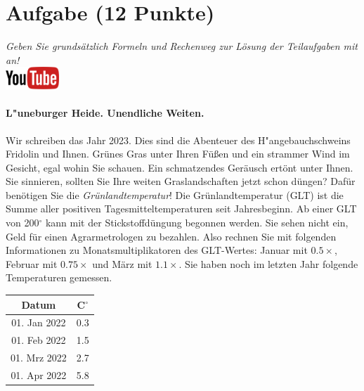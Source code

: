 \documentclass[a4paper, 9pt]{scrartcl}\usepackage[]{graphicx}\usepackage[]{xcolor}
\begin{document}
\clearpage

\section{Aufgabe \hfill (12 Punkte)}

\textit{Geben Sie grunds{\"a}tzlich Formeln und Rechenweg zur L{\"o}sung der
  Teilaufgaben mit an!} \\[1Ex]

\hfill\href{https://youtu.be/fiWGgCX-cE4}{\includegraphics[width =
  2cm]{img/youtube}} %
\hspace{2Ex}



\paragraph{L{"u}neburger Heide. Unendliche Weiten.}



Wir schreiben das Jahr 2023. Dies sind die Abenteuer
des H{"a}ngebauchschweins Fridolin und Ihnen. Gr{\"u}nes Gras unter Ihren F{\"u}{\ss}en und
ein strammer Wind im Gesicht, egal wohin Sie schauen. Ein schmatzendes
Ger{\"a}usch ert{\"o}nt unter Ihnen. Sie sinnieren, sollten Sie Ihre weiten
Graslandschaften jetzt schon d{\"u}ngen?  Daf{\"u}r ben{\"o}tigen Sie die
\textit{Gr{\"u}nlandtemperatur}! Die Gr{\"u}nlandtemperatur (GLT) ist die Summe aller
positiven Tagesmitteltemperaturen seit Jahresbeginn. Ab einer GLT von
200$^\circ$ kann mit der Stickstoffd{\"u}ngung begonnen werden. Sie sehen nicht
ein, Geld f{\"u}r einen Agrarmetrologen zu bezahlen. Also rechnen Sie mit
folgenden Informationen zu Monatsmultiplikatoren des GLT-Wertes: Januar mit
$0.5\times$, Februar mit $0.75\times$ und M{\"a}rz mit
$1.1\times$. Sie haben noch im letzten Jahr folgende Temperaturen
gemessen.

\begin{center}
\begin{tabular}{cc}
  \toprule
  Datum & C$^\circ$ \\
  \midrule
  01. Jan 2022 & 0.3\\
  01. Feb 2022 & 1.5\\
  01. Mrz 2022 & 2.7\\
  01. Apr 2022 & 5.8\\
  \bottomrule
\end{tabular}
\end{center}
\end{document}
